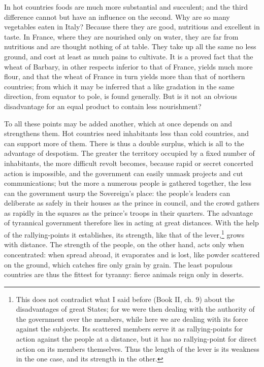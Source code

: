 \documentclass[12pt]{book}
\begin{document}
In hot countries foods are much more substantial and succulent; and the third difference cannot but have an influence on the second. Why are so many vegetables eaten in Italy? Because there they are good, nutritious and excellent in taste. In France, where they are nourished only on water, they are far from nutritious and are thought nothing of at table. They take up all the same no less ground, and cost at least as much pains to cultivate. It is a proved fact that the wheat of Barbary, in other respects inferior to that of France, yields much more flour, and that the wheat of France in turn yields more than that of northern countries; from which it may be inferred that a like gradation in the same direction, from equator to pole, is found generally. But is it not an obvious disadvantage for an equal product to contain less nourishment?

To all these points may be added another, which at once depends on and strengthens them. Hot countries need inhabitants less than cold countries, and can support more of them. There is thus a double surplus, which is all to the advantage of despotism. The greater the territory occupied by a fixed number of inhabitants, the more difficult revolt becomes, because rapid or secret concerted action is impossible, and the government can easily unmask projects and cut communications; but the more a numerous people is gathered together, the less can the government usurp the Sovereign's place: the people's leaders can deliberate as safely in their houses as the prince in council, and the crowd gathers as rapidly in the squares as the prince's troops in their quarters. The advantage of tyrannical government therefore lies in acting at great distances. With the help of the rallying-points it establishes, its strength, like that of the lever,\footnote{This does not contradict what I said before (Book II, ch. 9) about the disadvantages of great States; for we were then dealing with the authority of the government over the members, while here we are dealing with its force against the subjects. Its scattered members serve it as rallying-points for action against the people at a distance, but it has no rallying-point for direct action on its members themselves. Thus the length of the lever is its weakness in the one case, and its strength in the other.} grows with distance. The strength of the people, on the other hand, acts only when concentrated: when spread abroad, it evaporates and is lost, like powder scattered on the ground, which catches fire only grain by grain. The least populous countries are thus the fittest for tyranny: fierce animals reign only in deserts.
\end{document}
